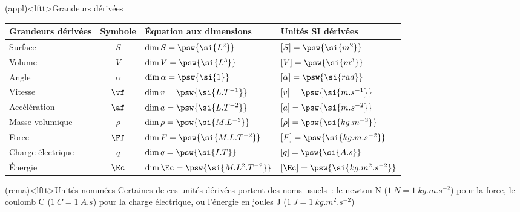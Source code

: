 \documentclass[../../main/main.tex]{subfiles}
\begin{document}
\begin{tcb*}[label=exem:grandeurs](appl)<lftt>{Grandeurs dérivées}
	\begin{center}
		\begin{tabular}{lcll}
			\toprule
			Grandeurs dérivées & Symbole  & Équation aux dimensions                    & Unités SI dérivées                        \\
			\midrule
			Surface            & $S$      & $\dim{S}      = \psw{\si{L^2}}$            & $ [S]      = \psw{\si{m^2}}           $   \\
			Volume             & $V$      & $\dim{V}      = \psw{\si{L^3}}$            & $ [V]      = \psw{\si{m^3}}           $   \\
			Angle              & $\alpha$ & $\dim{\alpha} = \psw{\si{1}}$              & $ [\alpha] = \psw{\si{rad}}           $   \\
			Vitesse            & $\vf$    & $\dim{v}      = \psw{\si{L.T^{-1}}}$       & $ [v]      = \psw{\si{m.s^{-1}}}      $   \\
			Accélération       & $\af$    & $\dim{a}      = \psw{\si{L.T^{-2}}}$       & $ [a]      = \psw{\si{m.s^{-2}}}      $   \\
			Masse volumique    & $\rho$   & $\dim{\rho}   = \psw{\si{M.L^{-3}}}$       & $ [\rho]   = \psw{\si{kg.m^{-3}}}     $   \\
			Force              & $\Ff$    & $\dim{F}      = \psw{\si{M.L.T^{-2}}}$     & $ [F]      = \psw{\si{kg.m.s^{-2}}}   $   \\
			Charge électrique  & $q$      & $\dim{q}      = \psw{\si{I.T}}$            & $ [q]      = \psw{\si{A.s}}           $   \\
			Énergie            & $\Ec$    & $\dim{\Ec}      = \psw{\si{M.L^2.T^{-2}}}$ & $ [\Ec]      = \psw{\si{kg.m^2.s^{-2}}} $ \\
			\bottomrule
		\end{tabular}
	\end{center}
\end{tcb*}
\begin{tcb}(rema)<lftt>{Unités nommées}
	Certaines de ces unités dérivées portent des noms usuels~: le newton N
	($\SI{1}{N} = \SI{1}{kg.m.s^{-2}}$) pour la force, le coulomb C ($\SI{1}{C} =
		\SI{1}{A.s}$) pour la charge électrique, ou l'énergie en joules
	J ($\SI{1}{J} = \SI{1}{kg.m^2.s^{-2}}$)
\end{tcb}
\end{document}
